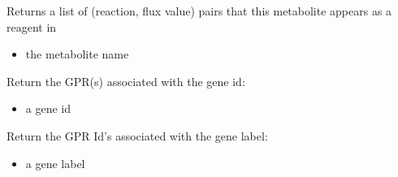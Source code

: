 \documentclass[letterpaper,10pt,english]{sphinxmanual}
\begin{document}
\begin{fulllineitems}

\begin{fulllineitems}
\label{\detokenize{modules_doc:cbmpy.CBModel.Model.getFluxesAssociatedWithSpecies}}
\pysigstartsignatures
{}
\pysigstopsignatures
\sphinxAtStartPar
Returns a list of (reaction, flux value) pairs that this metabolite appears as a reagent in
\begin{itemize}
\item {} 
\sphinxAtStartPar
{} the metabolite name

\end{itemize}

\end{fulllineitems}


\begin{fulllineitems}
\label{\detokenize{modules_doc:cbmpy.CBModel.Model.getGPRIdAssociatedWithGeneId}}
\pysigstartsignatures
{}
\pysigstopsignatures
\sphinxAtStartPar
Return the GPR(s) associated with the gene id:
\begin{itemize}
\item {} 
\sphinxAtStartPar
{} a gene id

\end{itemize}

\end{fulllineitems}


\begin{fulllineitems}
\label{\detokenize{modules_doc:cbmpy.CBModel.Model.getGPRIdAssociatedWithGeneLabel}}
\pysigstartsignatures
{}
\pysigstopsignatures
\sphinxAtStartPar
Return the GPR Id’s associated with the gene label:
\begin{itemize}
\item {} 
\sphinxAtStartPar
{} a gene label


\end{itemize}
\end{fulllineitems}
\end{fulllineitems}
\end{document}
